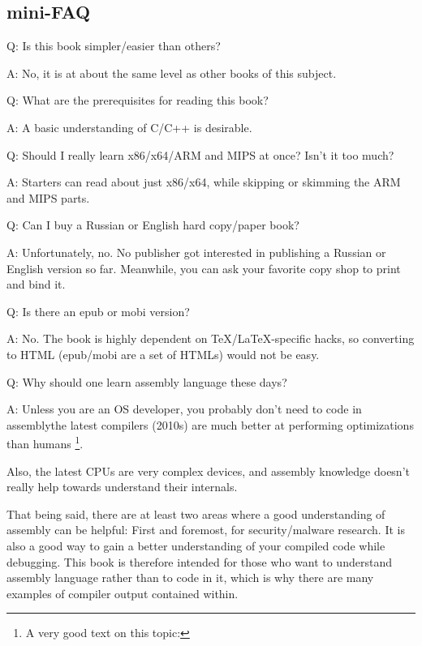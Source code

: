 \subsection*{mini-FAQ}

\par Q: Is this book simpler/easier than others?
\par A: No, it is at about the same level as other books of this subject.

\par Q: What are the prerequisites for reading this book?
\par A: A basic understanding of C/C++ is desirable.

\par Q: Should I really learn x86/x64/ARM and MIPS at once? Isn't it too much?
\par A: Starters can read about just x86/x64, while skipping or skimming the ARM and MIPS parts.

\par Q: Can I buy a Russian or English hard copy/paper book?
\par A: Unfortunately, no. No publisher got interested in publishing a Russian or English version so far.
Meanwhile, you can ask your favorite copy shop to print and bind it.

\par Q: Is there an epub or mobi version?
\par A: No. The book is highly dependent on TeX/LaTeX-specific hacks, so converting to HTML (epub/mobi are a set of HTMLs)
would not be easy.

\par Q: Why should one learn assembly language these days?
\par A: Unless you are an \ac{OS} developer, you probably don't need to code in assembly\textemdash{}the latest compilers (2010s) are much better at performing optimizations than humans \footnote{A very good text on this topic: \InSqBrackets{\AgnerFog}}.

Also, the latest \ac{CPU}s are very complex devices, and assembly knowledge doesn't really help towards understand their internals.

That being said, there are at least two areas where a good understanding of assembly can be helpful:
First and foremost, for security/malware research. It is also a good way to gain a better understanding of your compiled code while debugging.
This book is therefore intended for those who want to understand assembly language rather
than to code in it, which is why there are many examples of compiler output contained within.

